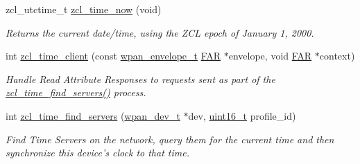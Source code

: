 \begin{DoxyCompactItemize}
zcl\-\_\-utctime\-\_\-t \hyperlink{group__zcl__time_gad56f618c84b428540c5ffcb60095462c}{zcl\-\_\-time\-\_\-now} (void)
\begin{DoxyCompactList}\small\item\em Returns the current date/time, using the Z\-C\-L epoch of January 1, 2000. \end{DoxyCompactList}\item 
int \hyperlink{group__zcl__time_ga2c66ee215547beae5b5dde4f23cc8e00}{zcl\-\_\-time\-\_\-client} (const \hyperlink{structwpan__envelope__t}{wpan\-\_\-envelope\-\_\-t} \hyperlink{group__hal_gaef060b3456fdcc093a7210a762d5f2ed}{F\-A\-R} $\ast$envelope, void \hyperlink{group__hal_gaef060b3456fdcc093a7210a762d5f2ed}{F\-A\-R} $\ast$context)
\begin{DoxyCompactList}\small\item\em Handle Read Attribute Responses to requests sent as part of the \hyperlink{group__zcl__time_ga32a901048d0bf5b6c6cf9a1cf7fb1e28}{zcl\-\_\-time\-\_\-find\-\_\-servers()} process. \end{DoxyCompactList}\item 
int \hyperlink{group__zcl__time_ga32a901048d0bf5b6c6cf9a1cf7fb1e28}{zcl\-\_\-time\-\_\-find\-\_\-servers} (\hyperlink{structwpan__dev__t}{wpan\-\_\-dev\-\_\-t} $\ast$dev, \hyperlink{group__hal_ga5a8b2dc9e45a9ee81a94ef304fb62505}{uint16\-\_\-t} profile\-\_\-id)
\begin{DoxyCompactList}\small\item\em Find Time Servers on the network, query them for the current time and then synchronize this device's clock to that time. \end{DoxyCompactList}\end{DoxyCompactItemize}
